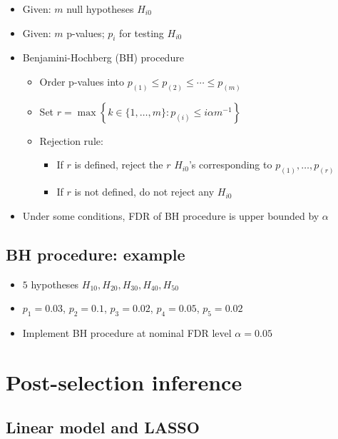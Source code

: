 \documentclass[]{article}
\providecommand{\tightlist}{%
  \setlength{\itemsep}{0pt}\setlength{\parskip}{0pt}}
\begin{document}
\begin{itemize}
\tightlist
\item
  Given: \(m\) null hypotheses \(H_{i0}\)
\item
  Given: \(m\) p-values; \(p_i\) for testing \(H_{i0}\)
\item
  Benjamini-Hochberg (BH) procedure

  \begin{itemize}
  \tightlist
  \item
    Order p-values into \(p_{(1)} \le p_{(2)} \le \cdots \le p_{(m)}\)
  \item
    Set
    \(r = \max \left\{ k \in \{1,\ldots,m \}: p_{(i)} \le i \alpha m^{-1} \right\}\)
  \item
    Rejection rule:

    \begin{itemize}
    \tightlist
    \item
      If \(r\) is defined, reject the \(r\) \(H_{i0}\)'s corresponding
      to \(p_{(1)},\ldots,p_{(r)}\)
    \item
      If \(r\) is not defined, do not reject any \(H_{i0}\)
    \end{itemize}
  \end{itemize}
\item
  Under some conditions, FDR of BH procedure is upper bounded by
  \(\alpha\)
\end{itemize}

\subsection{BH procedure: example}\label{bh-procedure-example}

\begin{itemize}
\item
  \(5\) hypotheses \(H_{10}, H_{20},H_{30},H_{40},H_{50}\)
\item
  \(p_1 = 0.03\), \(p_2 = 0.1\), \(p_3 = 0.02\), \(p_4 = 0.05\),
  \(p_5 = 0.02\)
\item
  Implement BH procedure at nominal FDR level \(\alpha =0.05\)
\end{itemize}

\section{Post-selection inference}\label{post-selection-inference}

\subsection{Linear model and LASSO}\label{linear-model-and-lasso}
\end{document}
